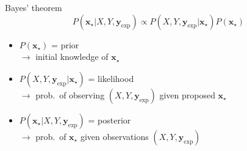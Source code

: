 \documentclass{beamer}
\newcommand{\x}{\mathbf x}
\newcommand{\y}{\mathbf y}
\newcommand{\xs}{\x_\star}
\newcommand{\yexp}{\y_\text{exp}}
\begin{document}
\begin{frame}{Bayes' theorem}
  \begin{equation*}
    P(\xs|X,Y,\yexp) \propto P(X,Y,\yexp|\xs) P(\xs)
  \end{equation*}
  \begin{itemize}
    \item $P(\xs)$ = prior \\
      $\rightarrow$ initial knowledge of $\xs$
    \item $P(X,Y,\yexp|\xs)$ = likelihood \\
      $\rightarrow$ prob.\ of observing $(X, Y, \yexp)$ given proposed $\xs$
      \color{theme!80!black}
    \item $P(\xs|X,Y,\yexp)$ = posterior \\
      $\rightarrow$ prob.\ of $\xs$ given observations $(X, Y, \yexp)$
  \end{itemize}
\end{frame}
\end{document}
